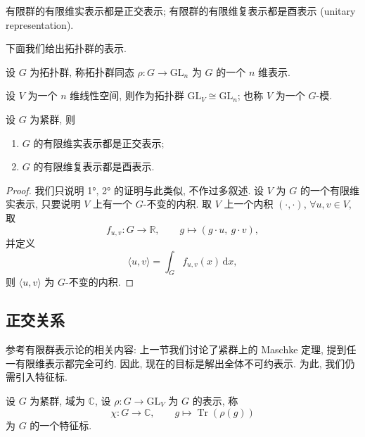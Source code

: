 \begin{theorem}\label{thm:maschke-finite-real}
有限群的有限维实表示都是正交表示; 有限群的有限维复表示都是酉表示
(unitary representation).
\end{theorem}

下面我们给出拓扑群的表示.

\begin{definition}\label{def:topological-rep}
设 $G$ 为拓扑群, 称拓扑群同态 $\rho\colon G\to\mathrm{GL}_n$ 为 $G$ 的一个 $n$ 维表示.
\end{definition}

\begin{remark}\label{rem:GL-module}
设 $V$ 为一个 $n$ 维线性空间, 则作为拓扑群 $\mathrm{GL}_V\cong\mathrm{GL}_n$;
也称 $V$ 为一个 $G$-模.
\end{remark}

\begin{theorem}[Maschke, 紧群]\label{thm:maschke-compact}
设 $G$ 为紧群, 则
\begin{enumerate}
  \item $G$ 的有限维实表示都是正交表示;
  \item $G$ 的有限维复表示都是酉表示.
\end{enumerate}
\end{theorem}

\begin{proof}
我们只说明 1°, 2° 的证明与此类似, 不作过多叙述.
设 $V$ 为 $G$ 的一个有限维实表示, 只要说明 $V$ 上有一个 $G$-不变的内积.
取 $V$ 上一个内积 $(\cdot,\cdot)$, $\forall u,v\in V$, 取
\[
  f_{u,v}\colon G\to\mathbb{R},\qquad g\longmapsto (g\cdot u,\ g\cdot v),
\]
并定义
\[
  \langle u,v\rangle=\int_G f_{u,v}(x)\,\mathrm{d}x,
\]
则 $\langle u,v\rangle$ 为 $G$-不变的内积.
\end{proof}

\subsection{正交关系}

参考有限群表示论的相关内容: 上一节我们讨论了紧群上的 Maschke 定理,
提到任一有限维表示都完全可约. 因此, 现在的目标是解出全体不可约表示.
为此, 我们仍需引入特征标.

\begin{definition}[特征标]\label{def:compact-character}
设 $G$ 为紧群, 域为 $\mathbb{C}$, 设 $\rho\colon G\to\mathrm{GL}_V$ 为 $G$ 的表示, 称
\[
  \chi\colon G\to\mathbb{C},\qquad g\longmapsto\operatorname{Tr}(\rho(g))
\]
为 $G$ 的一个特征标.
\end{definition}

